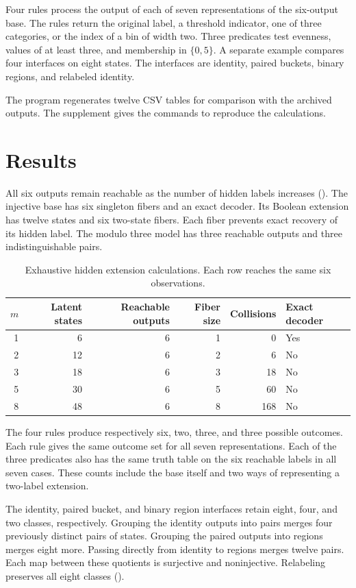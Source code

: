 Four rules process the output of each of seven representations of the six-output base. The rules return the original label, a threshold indicator, one of three categories, or the index of a bin of width two. Three predicates test evenness, values of at least three, and membership in \(\{0,5\}\). A separate example compares four interfaces on eight states. The interfaces are identity, paired buckets, binary regions, and relabeled identity.

The program regenerates twelve CSV tables for comparison with the archived outputs. The supplement gives the commands to reproduce the calculations.

\section{Results}
\label{sec:mainfindings}
All six outputs remain reachable as the number of hidden labels increases (). The injective base has six singleton fibers and an exact decoder. Its Boolean extension has twelve states and six two-state fibers. Each fiber prevents exact recovery of its hidden label. The modulo three model has three reachable outputs and three indistinguishable pairs.

\begin{table}[htbp]
\centering\small
\caption{Exhaustive hidden extension calculations. Each row reaches the same six observations.}
\label{tab:mainmultiplicity}
\begin{tabular}{@{}rrrrrl@{}}
\toprule
\(m\)&Latent states&Reachable outputs&Fiber size&Collisions&Exact decoder\\
\midrule
1&6&6&1&0&Yes\\
2&12&6&2&6&No\\
3&18&6&3&18&No\\
5&30&6&5&60&No\\
8&48&6&8&168&No\\
\bottomrule
\end{tabular}
\end{table}

The four rules produce respectively six, two, three, and three possible outcomes. Each rule gives the same outcome set for all seven representations. Each of the three predicates also has the same truth table on the six reachable labels in all seven cases. These counts include the base itself and two ways of representing a two-label extension.

The identity, paired bucket, and binary region interfaces retain eight, four, and two classes, respectively. Grouping the identity outputs into pairs merges four previously distinct pairs of states. Grouping the paired outputs into regions merges eight more. Passing directly from identity to regions merges twelve pairs. Each map between these quotients is surjective and noninjective. Relabeling preserves all eight classes ().

